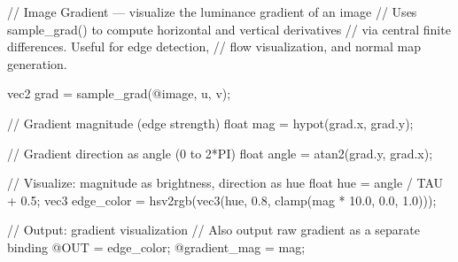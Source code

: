 // Image Gradient — visualize the luminance gradient of an image
// Uses sample_grad() to compute horizontal and vertical derivatives
// via central finite differences. Useful for edge detection,
// flow visualization, and normal map generation.

vec2 grad = sample_grad(@image, u, v);

// Gradient magnitude (edge strength)
float mag = hypot(grad.x, grad.y);

// Gradient direction as angle (0 to 2*PI)
float angle = atan2(grad.y, grad.x);

// Visualize: magnitude as brightness, direction as hue
float hue = angle / TAU + 0.5;
vec3 edge_color = hsv2rgb(vec3(hue, 0.8, clamp(mag * 10.0, 0.0, 1.0)));

// Output: gradient visualization
// Also output raw gradient as a separate binding
@OUT = edge_color;
@gradient_mag = mag;
